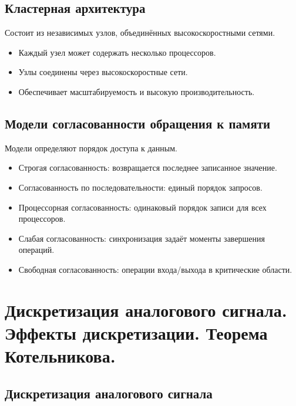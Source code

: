 	\subsection{Кластерная архитектура}
	Состоит из независимых узлов, объединённых высокоскоростными сетями.
	\begin{itemize}
		\item Каждый узел может содержать несколько процессоров.
		\item Узлы соединены через высокоскоростные сети.
		\item Обеспечивает масштабируемость и высокую производительность.
	\end{itemize}
	
	\subsection{Модели согласованности обращения к памяти}
	Модели определяют порядок доступа к данным.
	\begin{itemize}
		\item Строгая согласованность: возвращается последнее записанное значение.
		\item Согласованность по последовательности: единый порядок запросов.
		\item Процессорная согласованность: одинаковый порядок записи для всех процессоров.
		\item Слабая согласованность: синхронизация задаёт моменты завершения операций.
		\item Свободная согласованность: операции входа/выхода в критические области.
	\end{itemize}
	
	\newpage
	
	\section{Дискретизация аналогового сигнала. Эффекты дискретизации. Теорема Котельникова.}
	\vspace{-1em}
	\subsection{Дискретизация аналогового сигнала}
	
